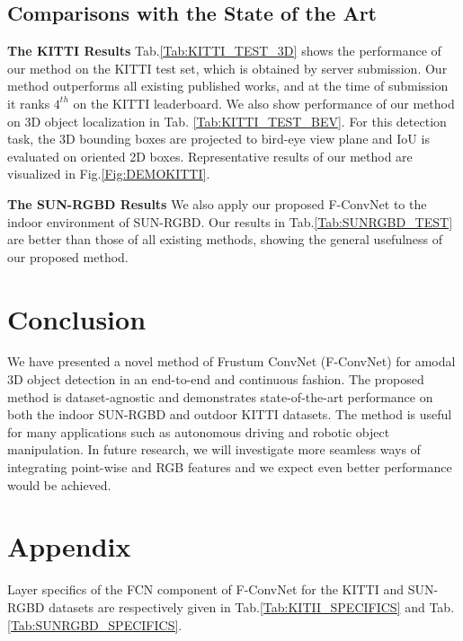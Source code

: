\documentclass[letterpaper, 10 pt, conference]{ieeeconf}
\begin{document}
\subsection{Comparisons with the State of the Art}

\noindent\textbf{The KITTI Results} Tab.\ref{Tab:KITTI_TEST_3D} shows the performance of our method on the KITTI test set, which is obtained by server submission. Our method outperforms all existing published works, and at the time of submission it ranks $4^{th}$ on the KITTI leaderboard.  We also show performance of our method on 3D object localization in Tab. \ref{Tab:KITTI_TEST_BEV}. For this detection task, the 3D bounding boxes are projected to bird-eye view plane and IoU is evaluated on oriented 2D boxes. Representative results of our method are visualized in Fig.\ref{Fig:DEMOKITTI}.

\vspace{0.1cm}
\noindent\textbf{The SUN-RGBD Results} We also apply our proposed F-ConvNet to the indoor environment of SUN-RGBD. Our results in Tab.\ref{Tab:SUNRGBD_TEST} are better than those of all existing methods, showing the general usefulness of our proposed method.

\section{Conclusion}

We have presented a novel method of Frustum ConvNet (F-ConvNet) for amodal 3D object detection in an end-to-end and continuous fashion. The proposed method is dataset-agnostic and demonstrates state-of-the-art performance on both the indoor SUN-RGBD and outdoor KITTI datasets. The method is useful for many applications such as autonomous driving and robotic object manipulation. In future research, we will investigate more seamless ways of integrating point-wise and RGB features and we expect even better performance would be achieved.




\section*{Appendix}

Layer specifics of the FCN component of F-ConvNet for the KITTI and SUN-RGBD datasets are respectively given in Tab.\ref{Tab:KITII_SPECIFICS} and Tab.\ref{Tab:SUNRGBD_SPECIFICS}.
\end{document}
